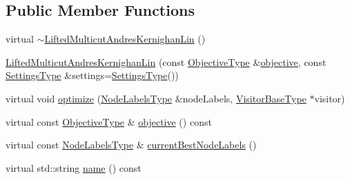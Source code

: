\subsection*{Public Member Functions}
\begin{DoxyCompactItemize}
\item 
virtual \hyperlink{classnifty_1_1graph_1_1opt_1_1lifted__multicut_1_1LiftedMulticutAndresKernighanLin_a987ec2f95d1c8833e2a32c20f59091c2}{$\sim$\+Lifted\+Multicut\+Andres\+Kernighan\+Lin} ()
\item 
\hyperlink{classnifty_1_1graph_1_1opt_1_1lifted__multicut_1_1LiftedMulticutAndresKernighanLin_a8c9e5c90d0e26e11a8d020c80624ddad}{Lifted\+Multicut\+Andres\+Kernighan\+Lin} (const \hyperlink{classnifty_1_1graph_1_1opt_1_1lifted__multicut_1_1LiftedMulticutAndresKernighanLin_a31b45ec18fa430d4f6231a60395b4b14}{Objective\+Type} \&\hyperlink{classnifty_1_1graph_1_1opt_1_1lifted__multicut_1_1LiftedMulticutAndresKernighanLin_a7e315a8fb58cfb031cd17acadfe09bfe}{objective}, const \hyperlink{structnifty_1_1graph_1_1opt_1_1lifted__multicut_1_1LiftedMulticutAndresKernighanLin_1_1SettingsType}{Settings\+Type} \&settings=\hyperlink{structnifty_1_1graph_1_1opt_1_1lifted__multicut_1_1LiftedMulticutAndresKernighanLin_1_1SettingsType}{Settings\+Type}())
\item 
virtual void \hyperlink{classnifty_1_1graph_1_1opt_1_1lifted__multicut_1_1LiftedMulticutAndresKernighanLin_ad5c474165f5364bce7f461f83894a100}{optimize} (\hyperlink{classnifty_1_1graph_1_1opt_1_1lifted__multicut_1_1LiftedMulticutAndresKernighanLin_a93990ac2b7ec99743b4765134a76ffe0}{Node\+Labels\+Type} \&node\+Labels, \hyperlink{classnifty_1_1graph_1_1opt_1_1lifted__multicut_1_1LiftedMulticutAndresKernighanLin_abce2decf7c7b89756c9acdfd70b8dc22}{Visitor\+Base\+Type} $\ast$visitor)
\item 
virtual const \hyperlink{classnifty_1_1graph_1_1opt_1_1lifted__multicut_1_1LiftedMulticutAndresKernighanLin_a31b45ec18fa430d4f6231a60395b4b14}{Objective\+Type} \& \hyperlink{classnifty_1_1graph_1_1opt_1_1lifted__multicut_1_1LiftedMulticutAndresKernighanLin_a7e315a8fb58cfb031cd17acadfe09bfe}{objective} () const
\item 
virtual const \hyperlink{classnifty_1_1graph_1_1opt_1_1lifted__multicut_1_1LiftedMulticutAndresKernighanLin_a93990ac2b7ec99743b4765134a76ffe0}{Node\+Labels\+Type} \& \hyperlink{classnifty_1_1graph_1_1opt_1_1lifted__multicut_1_1LiftedMulticutAndresKernighanLin_acd9b1de8aceaf4565c768303987e3c08}{current\+Best\+Node\+Labels} ()
\item 
virtual std\+::string \hyperlink{classnifty_1_1graph_1_1opt_1_1lifted__multicut_1_1LiftedMulticutAndresKernighanLin_a4ee4df60823384b6e1515a77f4ee2329}{name} () const
\end{DoxyCompactItemize}


